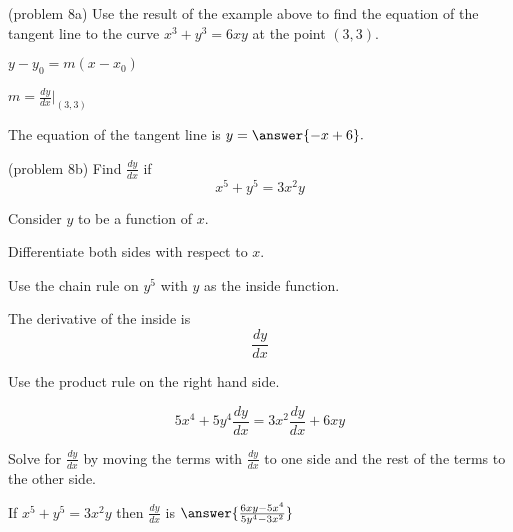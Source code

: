\documentclass[handout]{ximera}
\begin{document}
\begin{center}
\begin{foldable}
\end{foldable}
\end{center}


\begin{problem}(problem 8a)
Use the result of the example above to find the equation of the tangent line to the curve $x^3 + y^3 = 6xy$ at the point $(3,3).$

\begin{hint}
$y-y_0 = m(x-x_0)$
\end{hint}
\begin{hint}
$m = \frac{dy}{dx}\bigg|_{(3,3)}$
\end{hint}
The equation of the tangent line is $y = \answer{-x + 6}.$
\end{problem}




\begin{problem}(problem 8b)
  Find $\frac{dy}{dx}$ if
  \[
  x^5 + y^5 = 3x^2y
  \]
  
	  
    \begin{hint}
      Consider $y$ to be a function of $x$.
    \end{hint}
		\begin{hint}
		  Differentiate both sides with respect to $x$.
		\end{hint}
    \begin{hint}
      Use the chain rule on $y^5$ with $y$ as the inside function.
    \end{hint}
    \begin{hint}
      The derivative of the inside is 
      \[
      \frac{dy}{dx}
      \]
    \end{hint}
		\begin{hint}
      Use the product rule on the right hand side.
    \end{hint}
		\begin{hint}
		  \[
			5x^4 + 5y^4\frac{dy}{dx} = 3x^2\frac{dy}{dx} + 6xy
			\]
		\end{hint}
		\begin{hint}
		  Solve for $\frac{dy}{dx}$ by moving the terms with $\frac{dy}{dx}$ 
			to one side and the 
			rest of the terms to the other side.
		\end{hint}
    
		If $x^5 + y^5 = 3x^2y$ then $\frac{dy}{dx}$ is
		 $\answer{\frac{6xy - 5x^4}{5y^4 - 3x^2}}$
		
\end{problem}
\end{document}
